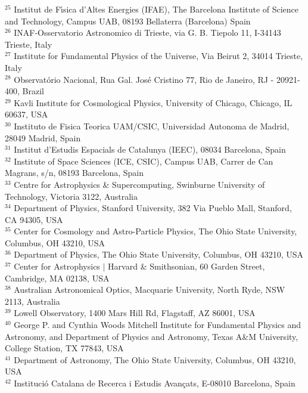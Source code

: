 {$^{25}$ Institut de F\'{\i}sica d'Altes Energies (IFAE), The Barcelona Institute of Science and Technology, Campus UAB, 08193 Bellaterra (Barcelona) Spain\\
$^{26}$ INAF-Osservatorio Astronomico di Trieste, via G. B. Tiepolo 11, I-34143 Trieste, Italy\\
$^{27}$ Institute for Fundamental Physics of the Universe, Via Beirut 2, 34014 Trieste, Italy\\
$^{28}$ Observat\'orio Nacional, Rua Gal. Jos\'e Cristino 77, Rio de Janeiro, RJ - 20921-400, Brazil\\
$^{29}$ Kavli Institute for Cosmological Physics, University of Chicago, Chicago, IL 60637, USA\\
$^{30}$ Instituto de Fisica Teorica UAM/CSIC, Universidad Autonoma de Madrid, 28049 Madrid, Spain\\
$^{31}$ Institut d'Estudis Espacials de Catalunya (IEEC), 08034 Barcelona, Spain\\
$^{32}$ Institute of Space Sciences (ICE, CSIC),  Campus UAB, Carrer de Can Magrans, s/n,  08193 Barcelona, Spain\\
$^{33}$ Centre for Astrophysics \& Supercomputing, Swinburne University of Technology, Victoria 3122, Australia\\
$^{34}$ Department of Physics, Stanford University, 382 Via Pueblo Mall, Stanford, CA 94305, USA\\
$^{35}$ Center for Cosmology and Astro-Particle Physics, The Ohio State University, Columbus, OH 43210, USA\\
$^{36}$ Department of Physics, The Ohio State University, Columbus, OH 43210, USA\\
$^{37}$ Center for Astrophysics $\vert$ Harvard \& Smithsonian, 60 Garden Street, Cambridge, MA 02138, USA\\
$^{38}$ Australian Astronomical Optics, Macquarie University, North Ryde, NSW 2113, Australia\\
$^{39}$ Lowell Observatory, 1400 Mars Hill Rd, Flagstaff, AZ 86001, USA\\
$^{40}$ George P. and Cynthia Woods Mitchell Institute for Fundamental Physics and Astronomy, and Department of Physics and Astronomy, Texas A\&M University, College Station, TX 77843,  USA\\
$^{41}$ Department of Astronomy, The Ohio State University, Columbus, OH 43210, USA\\
$^{42}$ Instituci\'o Catalana de Recerca i Estudis Avan\c{c}ats, E-08010 Barcelona, Spain\\
}
